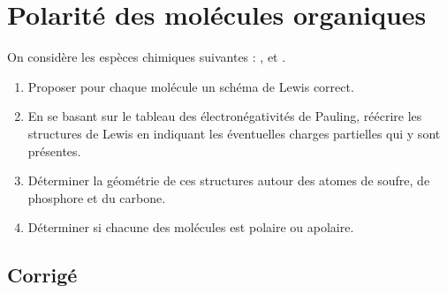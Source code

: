 \documentclass[a4paper,fontsize=11pt,fleqn]{scrartcl}
\begin{document}
\maketitle

\section{Polarité des molécules organiques}

On considère les espèces chimiques suivantes : ,  et .

\begin{enumerate}
    \item Proposer pour chaque molécule un schéma de Lewis correct.
    \item En se basant sur le tableau des électronégativités de Pauling, réécrire les structures de Lewis en indiquant les éventuelles charges partielles qui y sont présentes.
    \item Déterminer la géométrie de ces structures autour des atomes de soufre, de phosphore et du carbone.
    \item Déterminer si chacune des molécules est polaire ou apolaire.
\end{enumerate}

\subsection*{Corrigé}
\end{document}

